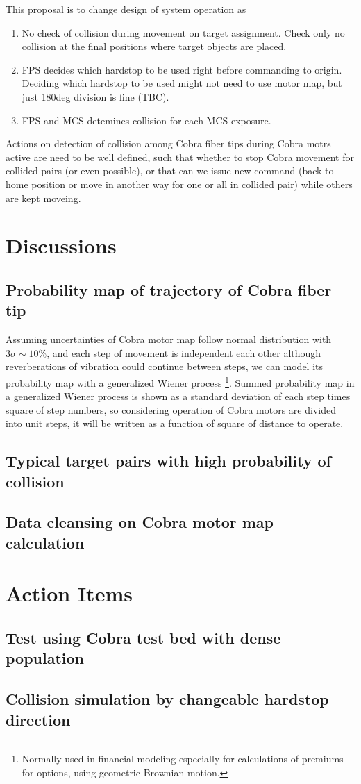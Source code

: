 \documentclass[a4paper,notitlepage]{article}
\begin{document}
This proposal is to change design of system operation as

\begin{enumerate}
  \item No check of collision during movement on target assignment.
    Check only no collision at the final positions where target objects are 
    placed.
  \item FPS decides which hardstop to be used right before commanding to origin.
    Deciding which hardstop to be used might not need to use motor map, but 
    just 180deg division is fine (TBC).
  \item FPS and MCS detemines collision for each MCS exposure.
\end{enumerate}

Actions on detection of collision among Cobra fiber tips during Cobra motrs 
active are need to be well defined, such that whether to stop Cobra movement 
for collided pairs (or even possible), or that can we issue new command (back 
to home position or move in another way for one or all in collided pair) 
while others are kept moveing. 

\section{Discussions}

\subsection{Probability map of trajectory of Cobra fiber tip}

Assuming uncertainties of Cobra motor map follow normal distribution with 
$3\sigma\sim 10\%$, and each step of movement is independent each other 
although reverberations of vibration could continue between steps, we can 
model its probability map with a generalized Wiener process
\footnote{Normally used in financial modeling especially for calculations of 
premiums for options, using geometric Brownian motion.}.
Summed probability map in a generalized Wiener process is shown as a standard 
deviation of each step times square of step numbers, so considering operation 
of Cobra motors are divided into unit steps, it will be written as a function 
of square of distance to operate. 


\subsection{Typical target pairs with high probability of collision}


\subsection{Data cleansing on Cobra motor map calculation}



\section{Action Items}

\subsection{Test using Cobra test bed with dense population}

\subsection{Collision simulation by changeable hardstop direction}
\end{document}
